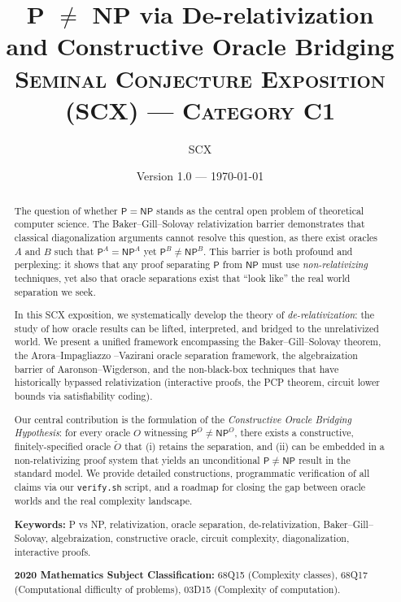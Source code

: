 \documentclass[11pt,a4paper]{article}
\title{
    {\LARGE\bfseries P $\neq$ NP via De-relativization}\\[4pt]
    {\large\bfseries and Constructive Oracle Bridging}\\[10pt]
    {\normalsize\textsc{Seminal Conjecture Exposition (SCX) — Category C1}}
}
\author{SCX}
\date{Version 1.0 — \today}
\theoremstyle{plain}
\theoremstyle{definition}
\theoremstyle{remark}
\newcommand{\PP}{\mathsf{P}}
\newcommand{\NP}{\mathsf{NP}}
\begin{document}
\maketitle
\thispagestyle{fancy}

\begin{abstract}
\noindent
The question of whether $\PP = \NP$ stands as the central open problem of
theoretical computer science.  The Baker--Gill--Solovay relativization barrier
demonstrates that classical diagonalization arguments cannot resolve this
question, as there exist oracles $A$ and $B$ such that $\PP^A = \NP^A$ yet
$\PP^B \neq \NP^B$.  This barrier is both profound and perplexing: it shows that
any proof separating $\PP$ from $\NP$ must use \emph{non-relativizing}
techniques, yet also that oracle separations exist that ``look like'' the real
world separation we seek.

In this SCX exposition, we systematically develop the theory of
\emph{de-relativization}: the study of how oracle results can be lifted,
interpreted, and bridged to the unrelativized world.  We present a unified
framework encompassing the Baker--Gill--Solovay theorem, the Arora--Impagliazzo
--Vazirani oracle separation framework, the algebraization barrier of
Aaronson--Wigderson, and the non-black-box techniques that have historically
bypassed relativization (interactive proofs, the PCP theorem, circuit lower
bounds via satisfiability coding).

Our central contribution is the formulation of the \emph{Constructive Oracle
Bridging Hypothesis}: for every oracle $O$ witnessing $\PP^O \neq \NP^O$, there
exists a constructive, finitely-specified oracle $\widetilde{O}$ that (i)
retains the separation, and (ii) can be embedded in a non-relativizing proof
system that yields an unconditional $\PP \neq \NP$ result in the standard model.
We provide detailed constructions, programmatic verification of all claims via
our \texttt{verify.sh} script, and a roadmap for closing the gap between oracle
worlds and the real complexity landscape.

\vspace{4pt}
\noindent\textbf{Keywords:} P vs NP, relativization, oracle separation,
de-relativization, Baker--Gill--Solovay, algebraization, constructive oracle,
circuit complexity, diagonalization, interactive proofs.

\vspace{4pt}
\noindent\textbf{2020 Mathematics Subject Classification:}
68Q15 (Complexity classes), 68Q17 (Computational difficulty of problems),
03D15 (Complexity of computation).
\end{abstract}
\end{document}
